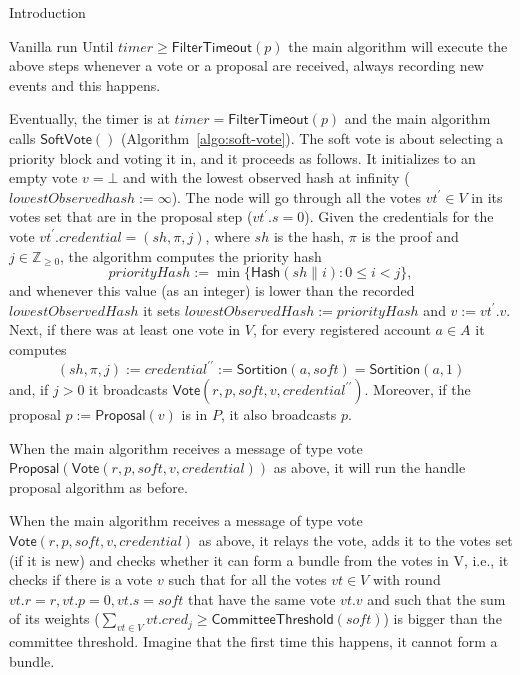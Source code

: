 \documentclass[10pt,a4paper]{article}
\begin{document}
\begin{section}{Introduction}
\begin{subsection}{Vanilla run}
Until $timer\ge \mathsf{FilterTimeout}(p)$ the main algorithm will execute the above steps
whenever a vote or a proposal are received, always recording new events and this happens.

Eventually, the timer is at $timer=\mathsf{FilterTimeout}(p)$ and the main algorithm calls 
$\mathsf{SoftVote()}$ (Algorithm~\ref{algo:soft-vote}).
The soft vote is about selecting a priority block and voting it in, and it proceeds as follows.
It initializes to an empty vote $v=\bot$ and with the lowest observed hash at infinity ($lowestObservedhash:=\infty$).
The node will go through all the votes $vt^\prime\in V$ in its votes set that are in the
proposal step ($vt^\prime.s=0$).
Given the credentials for the vote $vt^\prime.credential=(sh,\pi, j)$, where $sh$ is the hash,
$\pi$ is the proof and $j\in\mathbb{Z}_{\geq 0}$, the algorithm computes the priority hash
$$
priorityHash:=\min\{\mathsf{Hash}(sh\| i): 0\le i<j\},
$$
and whenever this value (as an integer) is lower than the recorded 
$lowestObservedHash$ it sets 
$lowestObservedHash:=priorityHash$ and $v:=vt^\prime.v$.
Next, if there was at least one vote in $V$, for every registered account $a\in A$
it computes 
$$
(sh,\pi,j):=credential^{\prime\prime}:=\mathsf{Sortition}(a,soft)=\mathsf{Sortition}(a,1)
$$
and, if $j>0$ it broadcasts $\mathsf{Vote}(r,p,soft,v,credential^{\prime\prime})$.
Moreover, if the proposal $p:=\mathsf{Proposal}(v)$ is in $P$, it also broadcasts $p$.

When the main algorithm receives a message of type vote 
$\mathsf{Proposal}(\mathsf{Vote}(r,p,soft,v,credential))$ as above, it will
run the handle proposal algorithm as before.

When the main algorithm receives a message of type vote 
$\mathsf{Vote}(r,p,soft,v,credential)$ as above, it relays the vote, adds it to the
votes set (if it is new) and checks whether it can form a bundle from the 
votes in V, i.e., it checks if there is a vote $v$ such that for all the votes 
$vt\in V$ with round $vt.r=r, vt.p=0, vt.s=soft$ that have the same vote $vt.v$ 
and such that the sum of its weights ($\sum_{vt\in V} vt.cred_j\ge \mathsf{CommitteeThreshold}(soft)$) 
is bigger than the committee threshold. 
Imagine that the first time this happens, it cannot form a bundle. 


\end{subsection}
\end{section}
\end{document}
